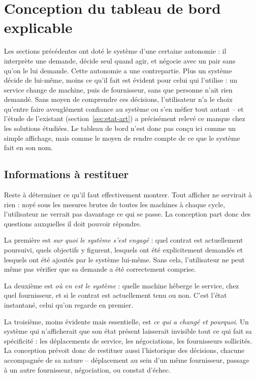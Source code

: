 \section{Conception du tableau de bord explicable}
\label{sec:conception-dashboard}

Les sections précédentes ont doté le système d'une certaine autonomie : il interprète une demande, décide seul quand agir, et négocie avec un pair sans qu'on le lui demande. Cette autonomie a une contrepartie. Plus un système décide de lui-même, moins ce qu'il fait est évident pour celui qui l'utilise : un service change de machine, puis de fournisseur, sans que personne n'ait rien demandé. Sans moyen de comprendre ces décisions, l'utilisateur n'a le choix qu'entre faire aveuglément confiance au système ou s'en méfier tout autant -- et l'étude de l'existant (section~\ref{sec:etat-art}) a précisément relevé ce manque chez les solutions étudiées. Le tableau de bord n'est donc pas conçu ici comme un simple affichage, mais comme le moyen de rendre compte de ce que le système fait en son nom.

\subsection{Informations à restituer}

Reste à déterminer ce qu'il faut effectivement montrer. Tout afficher ne servirait à rien : noyé sous les mesures brutes de toutes les machines à chaque cycle, l'utilisateur ne verrait pas davantage ce qui se passe. La conception part donc des questions auxquelles il doit pouvoir répondre.

La première est \emph{sur quoi le système s'est engagé} : quel contrat est actuellement poursuivi, quels objectifs y figurent, lesquels ont été explicitement demandés et lesquels ont été ajoutés par le système lui-même. Sans cela, l'utilisateur ne peut même pas vérifier que sa demande a été correctement comprise.

La deuxième est \emph{où en est le système} : quelle machine héberge le service, chez quel fournisseur, et si le contrat est actuellement tenu ou non. C'est l'état instantané, celui qu'on regarde en premier.

La troisième, moins évidente mais essentielle, est \emph{ce qui a changé et pourquoi}. Un système qui n'afficherait que son état présent laisserait invisible tout ce qui fait sa spécificité : les déplacements de service, les négociations, les fournisseurs sollicités. La conception prévoit donc de restituer aussi l'historique des décisions, chacune accompagnée de sa nature -- déplacement au sein d'un même fournisseur, passage à un autre fournisseur, négociation, ou constat d'échec.

